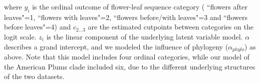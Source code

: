 \documentclass{article}[12pt]
\begin{document}
{where $y_i$ is the ordinal outcome of flower-leaf sequence category ( ``flowers after leaves"=1, ``flowers with leaves"=2, ``flowers before/with leaves"=3 and ``flowers before leaves"=4) and $c_{2...3}$ are the estimated cutpoints between categories on the logit scale. $z_i$ is the linear component of the underlying latent variable model. $\alpha$ describes a grand intercept, and we modeled the influence of phylogeny ($\alpha_{phylo}$) as above. Note that this model includes four ordinal categories, while our model of the American Plums clade included six, due to the different underlying structures of the two datasets.
%
%
%
%
%
%  
  
}
\end{document}
